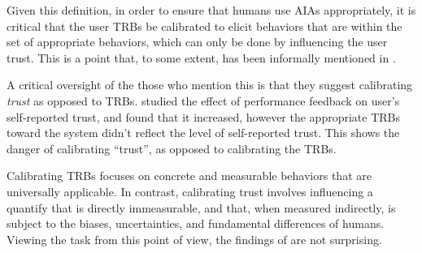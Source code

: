     
    Given this definition, in order to ensure that humans use AIAs appropriately, it is critical that the user TRBs be calibrated to elicit behaviors that are within the set of appropriate behaviors, which can only be done by influencing the user trust. This is a point that, to some extent, has been informally mentioned in \citet{Muir1994-ow,Muir1987-mk,Lillard2016-yg,Lee2004-pv,Hutchins2015-if}.

    A critical oversight of the those who mention this is that they suggest calibrating \emph{trust} as opposed to TRBs. \citet{Dzindolet2003-ts} studied the effect of performance feedback on user's self-reported trust, and found that it increased, however the appropriate TRBs toward the system didn't reflect the level of self-reported trust. This shows the danger of calibrating ``trust'', as opposed to calibrating the TRBs.

    Calibrating TRBs focuses on concrete and measurable behaviors that are universally applicable. In contrast, calibrating trust involves influencing a quantify that is directly immeasurable, and that, when measured indirectly, is subject to the biases, uncertainties, and fundamental differences of humans. Viewing the task from this point of view, the findings of \citeauthor{Dzindolet2003-ts} are not surprising.

